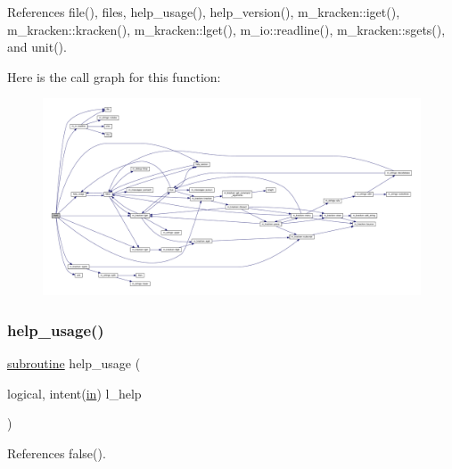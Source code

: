 References file(), files, help\+\_\+usage(), help\+\_\+version(), m\+\_\+kracken\+::iget(), m\+\_\+kracken\+::kracken(), m\+\_\+kracken\+::lget(), m\+\_\+io\+::readline(), m\+\_\+kracken\+::sgets(), and unit().

Here is the call graph for this function\+:
\nopagebreak
\begin{figure}[H]
\begin{center}
\leavevmode
\includegraphics[width=350pt]{findll_8f90_ad79178a6988911a19f458d5ce80255ea_cgraph}
\end{center}
\end{figure}
\mbox{\label{findll_8f90_a3e09a3b52ee8fb04eeb93fe5761626a8}} 
\subsubsection{\texorpdfstring{help\+\_\+usage()}{help\_usage()}}
{\footnotesize\ttfamily \hyperlink{M__stopwatch_83_8txt_acfbcff50169d691ff02d4a123ed70482}{subroutine} help\+\_\+usage (\begin{DoxyParamCaption}\item[{logical, intent(\hyperlink{M__journal_83_8txt_afce72651d1eed785a2132bee863b2f38}{in})}]{l\+\_\+help }\end{DoxyParamCaption})}



References false().

